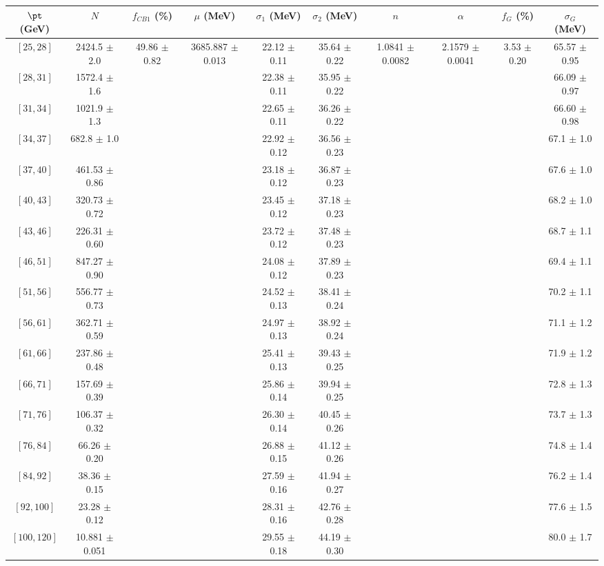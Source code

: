 \begin{tabular}{c||c|c|c|c|c|c|c|c|c}
$\pt$ (GeV) & $N$ & $f_{CB1}$ (\%)  & $\mu$ (MeV) & $\sigma_1$ (MeV) & $\sigma_2$ (MeV) & $n$ & $\alpha$ & $f_G$ (\%) & $\sigma_G$ (MeV) \\
\hline
$[25, 28]$ & 2424.5 $\pm$ 2.0 & \multirow{17}{*}{49.86 $\pm$ 0.82} & \multirow{17}{*}{3685.887 $\pm$ 0.013} & 22.12 $\pm$ 0.11 & 35.64 $\pm$ 0.22 & \multirow{17}{*}{1.0841 $\pm$ 0.0082} & \multirow{17}{*}{2.1579 $\pm$ 0.0041} & \multirow{17}{*}{3.53 $\pm$ 0.20} & 65.57 $\pm$ 0.95\\
$[28, 31]$ & 1572.4 $\pm$ 1.6 &  &  & 22.38 $\pm$ 0.11 & 35.95 $\pm$ 0.22 &  &  &  & 66.09 $\pm$ 0.97\\
$[31, 34]$ & 1021.9 $\pm$ 1.3 &  &  & 22.65 $\pm$ 0.11 & 36.26 $\pm$ 0.22 &  &  &  & 66.60 $\pm$ 0.98\\
$[34, 37]$ & 682.8 $\pm$ 1.0 &  &  & 22.92 $\pm$ 0.12 & 36.56 $\pm$ 0.23 &  &  &  & 67.1 $\pm$ 1.0\\
$[37, 40]$ & 461.53 $\pm$ 0.86 &  &  & 23.18 $\pm$ 0.12 & 36.87 $\pm$ 0.23 &  &  &  & 67.6 $\pm$ 1.0\\
$[40, 43]$ & 320.73 $\pm$ 0.72 &  &  & 23.45 $\pm$ 0.12 & 37.18 $\pm$ 0.23 &  &  &  & 68.2 $\pm$ 1.0\\
$[43, 46]$ & 226.31 $\pm$ 0.60 &  &  & 23.72 $\pm$ 0.12 & 37.48 $\pm$ 0.23 &  &  &  & 68.7 $\pm$ 1.1\\
$[46, 51]$ & 847.27 $\pm$ 0.90 &  &  & 24.08 $\pm$ 0.12 & 37.89 $\pm$ 0.23 &  &  &  & 69.4 $\pm$ 1.1\\
$[51, 56]$ & 556.77 $\pm$ 0.73 &  &  & 24.52 $\pm$ 0.13 & 38.41 $\pm$ 0.24 &  &  &  & 70.2 $\pm$ 1.1\\
$[56, 61]$ & 362.71 $\pm$ 0.59 &  &  & 24.97 $\pm$ 0.13 & 38.92 $\pm$ 0.24 &  &  &  & 71.1 $\pm$ 1.2\\
$[61, 66]$ & 237.86 $\pm$ 0.48 &  &  & 25.41 $\pm$ 0.13 & 39.43 $\pm$ 0.25 &  &  &  & 71.9 $\pm$ 1.2\\
$[66, 71]$ & 157.69 $\pm$ 0.39 &  &  & 25.86 $\pm$ 0.14 & 39.94 $\pm$ 0.25 &  &  &  & 72.8 $\pm$ 1.3\\
$[71, 76]$ & 106.37 $\pm$ 0.32 &  &  & 26.30 $\pm$ 0.14 & 40.45 $\pm$ 0.26 &  &  &  & 73.7 $\pm$ 1.3\\
$[76, 84]$ & 66.26 $\pm$ 0.20 &  &  & 26.88 $\pm$ 0.15 & 41.12 $\pm$ 0.26 &  &  &  & 74.8 $\pm$ 1.4\\
$[84, 92]$ & 38.36 $\pm$ 0.15 &  &  & 27.59 $\pm$ 0.16 & 41.94 $\pm$ 0.27 &  &  &  & 76.2 $\pm$ 1.4\\
$[92, 100]$ & 23.28 $\pm$ 0.12 &  &  & 28.31 $\pm$ 0.16 & 42.76 $\pm$ 0.28 &  &  &  & 77.6 $\pm$ 1.5\\
$[100, 120]$ & 10.881 $\pm$ 0.051 &  &  & 29.55 $\pm$ 0.18 & 44.19 $\pm$ 0.30 &  &  &  & 80.0 $\pm$ 1.7\\
\end{tabular}
